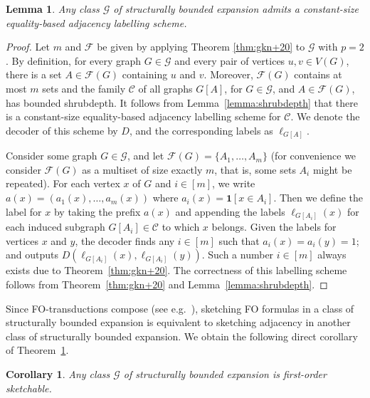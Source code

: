 \documentclass[11pt]{article}
\newtheorem{lemma}[thm]{Lemma}
\newtheorem{corollary}[thm]{Corollary}
\theoremstyle{definition}
\newcommand{\ind}[1]{\mathbf{1}[ #1 ]}
\begin{document}
\begin{lemma}\label{adj:sbe}
\label{lemma:sbe}
Any class $\mathcal{G}$ of structurally bounded expansion admits a constant-size equality-based
adjacency labelling scheme.
\end{lemma}

\begin{proof}
Let $m$ and $\mathcal{F}$ be given by applying Theorem \ref{thm:gkn+20} to $\mathcal{G}$ with $p=2$.
By definition, for every graph $G \in \mathcal G$ and every pair of vertices $u,v \in V(G)$, there
is a set $A \in \mathcal{F}(G)$ containing $u$ and $v$. Moreover, $\mathcal{F}(G)$ contains at most
$m$ sets and the family $\mathcal{C}$ of all graphs $G[A]$, for $G\in \mathcal{G}$, and $A\in
\mathcal{F}(G)$, has bounded shrubdepth. It follows from Lemma~\ref{lemma:shrubdepth} that there is
a constant-size equality-based adjacency labelling scheme for $\mathcal C$. We denote the decoder of
this scheme by $D$, and the corresponding labels as $\ell_{G[A]}$.

Consider some graph $G\in \mathcal{G}$, and let
$\mathcal{F}(G)=\{A_1,\ldots,A_m\}$ (for convenience we consider
$\mathcal{F}(G)$ as a multiset of size exactly $m$, that is, some sets $A_i$
might be repeated). For each vertex
$x$ of $G$ and $i \in [m]$, we write $a(x) = (a_1(x), \dotsc, a_m(x))$ where $a_i(x) = \ind{x \in
A_i}$. Then we define the label for $x$ by taking the prefix $a(x)$ and appending the labels
$\ell_{G[A_i]}(x)$ for each induced subgraph $G[A_i] \in \mathcal C$ to which $x$ belongs. Given
the labels for vertices $x$ and $y$, the decoder finds any $i \in [m]$ such that $a_i(x)=a_i(y)=1$;
and outputs $D(\ell_{G[A_i]}(x), \ell_{G[A_i]}(y))$. Such a number $i \in [m]$ always exists due
to Theorem~\ref{thm:gkn+20}.  The correctness of this labelling scheme follows from
Theorem~\ref{thm:gkn+20} and Lemma~\ref{lemma:shrubdepth}.
\end{proof}



Since FO-transductions compose (see e.g.~\cite{NOS22}), sketching FO formulas in a class of
structurally bounded expansion is equivalent to sketching adjacency in another class of structurally
bounded expansion. We obtain the following direct corollary of Theorem~\ref{adj:sbe}.

  \begin{corollary}\label{cor:fosketch}
Any class $\mathcal{G}$ of structurally bounded expansion is
first-order sketchable.
  \end{corollary}
  
\end{document}
